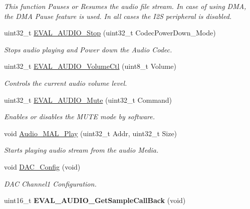 \begin{DoxyCompactItemize}
\begin{DoxyCompactList}\small\item\em This function Pauses or Resumes the audio file stream. In case of using D\-M\-A, the D\-M\-A Pause feature is used. In all cases the I2\-S peripheral is disabled. \end{DoxyCompactList}\item 
uint32\-\_\-t \hyperlink{group___s_t_m32_f4___d_i_s_c_o_v_e_r_y___a_u_d_i_o___c_o_d_e_c___exported___functions_ga058f4c3e44690ce595ac679e02d7332a}{E\-V\-A\-L\-\_\-\-A\-U\-D\-I\-O\-\_\-\-Stop} (uint32\-\_\-t Codec\-Power\-Down\-\_\-\-Mode)
\begin{DoxyCompactList}\small\item\em Stops audio playing and Power down the Audio Codec. \end{DoxyCompactList}\item 
uint32\-\_\-t \hyperlink{group___s_t_m32_f4___d_i_s_c_o_v_e_r_y___a_u_d_i_o___c_o_d_e_c___exported___functions_gacc2d90eb028556f428ca8fd703df74bb}{E\-V\-A\-L\-\_\-\-A\-U\-D\-I\-O\-\_\-\-Volume\-Ctl} (uint8\-\_\-t Volume)
\begin{DoxyCompactList}\small\item\em Controls the current audio volume level. \end{DoxyCompactList}\item 
uint32\-\_\-t \hyperlink{group___s_t_m32_f4___d_i_s_c_o_v_e_r_y___a_u_d_i_o___c_o_d_e_c___exported___functions_gaffb514fd732abc2186161a5bcdc69886}{E\-V\-A\-L\-\_\-\-A\-U\-D\-I\-O\-\_\-\-Mute} (uint32\-\_\-t Command)
\begin{DoxyCompactList}\small\item\em Enables or disables the M\-U\-T\-E mode by software. \end{DoxyCompactList}\item 
void \hyperlink{group___s_t_m32_f4___d_i_s_c_o_v_e_r_y___a_u_d_i_o___c_o_d_e_c___exported___functions_ga61e4aae22494a20a40ca16f66d0663a0}{Audio\-\_\-\-M\-A\-L\-\_\-\-Play} (uint32\-\_\-t Addr, uint32\-\_\-t Size)
\begin{DoxyCompactList}\small\item\em Starts playing audio stream from the audio Media. \end{DoxyCompactList}\item 
void \hyperlink{group___s_t_m32_f4___d_i_s_c_o_v_e_r_y___a_u_d_i_o___c_o_d_e_c___exported___functions_ga1c4fcf5b7727573c3b30e5b95e61cdcc}{D\-A\-C\-\_\-\-Config} (void)
\begin{DoxyCompactList}\small\item\em D\-A\-C Channel1 Configuration. \end{DoxyCompactList}\item 
\hypertarget{group___s_t_m32_f4___d_i_s_c_o_v_e_r_y___a_u_d_i_o___c_o_d_e_c___exported___functions_ga083526166f89787eaf0234b5bc421039}{uint16\-\_\-t {\bfseries E\-V\-A\-L\-\_\-\-A\-U\-D\-I\-O\-\_\-\-Get\-Sample\-Call\-Back} (void)}\label{group___s_t_m32_f4___d_i_s_c_o_v_e_r_y___a_u_d_i_o___c_o_d_e_c___exported___functions_ga083526166f89787eaf0234b5bc421039}


\end{DoxyCompactItemize}
